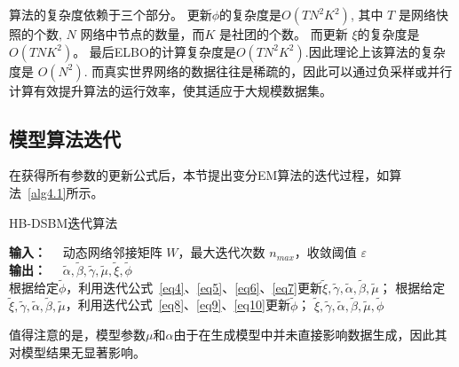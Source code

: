 
算法的复杂度依赖于三个部分。 更新$\phi$的复杂度是$O(TN^2K^2)$, 其中 $T$ 是网络快照的个数,  $N$ 网络中节点的数量，而$K$ 是社团的个数。 而更新 $\xi$的复杂度是$O(TNK^2)$。 最后ELBO的计算复杂度是$O(TN^2K^2)$.因此理论上该算法的复杂度是 $O(N^2)$. 而真实世界网络的数据往往是稀疏的，因此可以通过负采样或并行计算有效提升算法的运行效率，使其适应于大规模数据集。



\subsection{模型算法迭代}

在获得所有参数的更新公式后，本节提出变分EM算法的迭代过程，如算法~\ref{alg4.1}所示。

\begin{algorithm}
	\caption{HB-DSBM迭代算法}\label{alg4.1}
	\begin{algorithmic}[1]
		\STATE \textbf{输入：}~~ 动态网络邻接矩阵 $W$，最大迭代次数 $n_{max}$，收敛阈值 $\varepsilon$ \\
		\STATE \textbf{输出：}~~ $\widetilde{\alpha}, \widetilde{\beta}, \widetilde{\gamma}, \widetilde{\mu}, \widetilde{\xi}, \widetilde{\phi}$ \\
		\REPEAT
		\STATE 根据给定$\widetilde{\phi}$，利用迭代公式~\ref{eq4}、\ref{eq5}、\ref{eq6}、\ref{eq7}更新$\widetilde{\xi}, \widetilde{\gamma}, \widetilde{\alpha}, \widetilde{\beta}, \widetilde{\mu}$；
		\STATE 根据给定$\widetilde{\xi}, \widetilde{\gamma}, \widetilde{\alpha}, \widetilde{\beta}, \widetilde{\mu}$，利用迭代公式~\ref{eq8}、\ref{eq9}、\ref{eq10}更新$\widetilde{\phi}$；
		\RETURN $\widetilde{\xi}, \widetilde{\gamma}, \widetilde{\alpha}, \widetilde{\beta}, \widetilde{\mu}, \widetilde{\phi}$
	\end{algorithmic}
\end{algorithm}
值得注意的是，模型参数$\mu$和$\alpha$由于在生成模型中并未直接影响数据生成，因此其对模型结果无显著影响。

